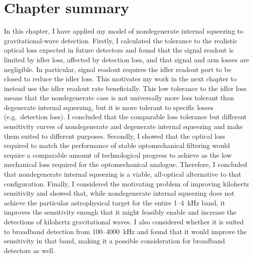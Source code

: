 \section{Chapter summary}

In this chapter, I have applied my model of nondegenerate internal squeezing to gravitational-wave detection. %
Firstly, I calculated the tolerance to the realistic optical loss expected in future detectors and found that the signal readout is limited by idler loss, affected by detection loss, and that signal and arm losses are negligible. In particular, signal readout requires the idler readout port to be closed to reduce the idler loss. This motivates my work in the next chapter to instead use the idler readout rate beneficially. This low tolerance to the idler loss means that the nondegenerate case is not universally more loss tolerant than degenerate internal squeezing, but it is more tolerant to specific losses (e.g.\ detection loss). I concluded that the comparable loss tolerance but different sensitivity curves of nondegenerate and degenerate internal squeezing and make them suited to different purposes. 
Secondly, I showed that the optical loss required to match the performance of stable optomechanical filtering would require a comparable amount of technological progress to achieve as the low mechanical loss required for the optomechanical analogue. Therefore, I concluded that nondegenerate internal squeezing is a viable, all-optical alternative to that configuration.
Finally, I considered the motivating problem of improving kilohertz sensitivity and showed that, while nondegenerate internal squeezing does not achieve the particular astrophysical target for the entire 1--4~kHz band, it improves the sensitivity enough that it might feasibly enable and increase the detections of kilohertz gravitational waves. I also considered whether it is suited to broadband detection from 100--4000~kHz and found that it would improve the sensitivity in that band, making it a possible consideration for broadband detectors as well.



